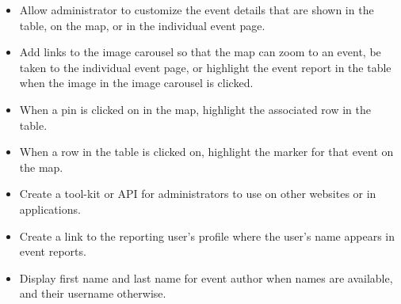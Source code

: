 \begin{itemize}
\item Allow administrator to customize the event details that are shown in the table, on the map, or in the individual event page.
\item Add links to the image carousel so that the map can zoom to an event, be taken to the individual event page, or highlight the event report in the table when the image in the image carousel is clicked.
\item When a pin is clicked on in the map, highlight the associated row in the table.
\item When a row in the table is clicked on, highlight the marker for that event on the map.
\item Create a tool-kit or API for administrators to use on other websites or in applications.
\item Create a link to the reporting user's profile where the user's name appears in event reports.
\item Display first name and last name for event author when names are available, and their username otherwise.
\end{itemize}